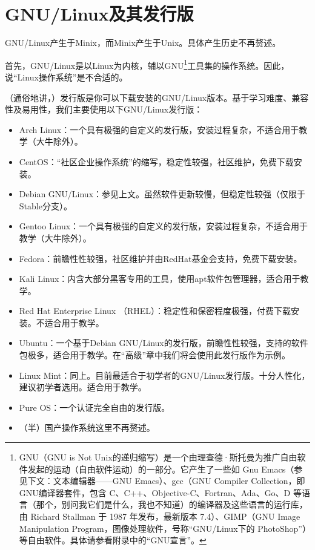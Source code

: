 \documentclass{book}
\begin{document}
\section{GNU/Linux及其发行版}
GNU/Linux产生于Minix，而Minix产生于Unix。具体产生历史不再赘述。\par
首先，GNU/Linux是以Linux为内核，辅以GNU\footnote{GNU（GNU is Not Unix的递归缩写）是一个由理查德·斯托曼为推广自由软件发起的运动（自由软件运动）的一部分。它产生了一些如 Gnu Emacs（参见下文：文本编辑器——GNU Emacs）、gcc（GNU Compiler Collection，即GNU编译器套件，包含 C、C++、Objective-C、Fortran、Ada、Go、D 等语言（那个，别问我它们是什么，我也不知道）的编译器及这些语言的运行库，由 Richard Stallman 于 1987 年发布，最新版本 7.4）、GIMP（GNU Image Manipulation Program，图像处理软件，号称“GNU/Linux下的 PhotoShop”）等自由软件。具体请参看附录中的“GNU宣言”。}工具集的操作系统。因此，说“Linux操作系统”是不合适的。\par
（通俗地讲，）发行版是你可以下载安装的GNU/Linux版本。基于学习难度、兼容性及易用性，我们主要使用以下GNU/Linux发行版：
\begin{itemize}
	\item Arch Linux：一个具有极强的自定义的发行版，安装过程复杂，不适合用于教学（大牛除外）。
	\item CentOS：“社区企业操作系统”的缩写，稳定性较强，社区维护，免费下载安装。
	\item Debian GNU/Linux：参见上文。虽然软件更新较慢，但稳定性较强（仅限于Stable分支）。
	\item Gentoo Linux：一个具有极强的自定义的发行版，安装过程复杂，不适合用于教学（大牛除外）。
	\item Fedora：前瞻性性较强，社区维护并由RedHat基金会支持，免费下载安装。
	\item Kali Linux：内含大部分黑客专用的工具，使用apt软件包管理器，适合用于教学。
	\item Red Hat Enterprise Linux （RHEL）：稳定性和保密程度极强，付费下载安装。不适合用于教学。
	\item Ubuntu：一个基于Debian GNU/Linux的发行版，前瞻性性较强，支持的软件包极多，适合用于教学。在“高级”章中我们将会使用此发行版作为示例。
	\item Linux Mint：同上。目前最适合于初学者的GNU/Linux发行版。十分人性化，建议初学者选用。适合用于教学。
	\item Pure OS：一个认证完全自由的发行版。
	\item （半）国产操作系统这里不再赘述。
\end{itemize}
\end{document}
